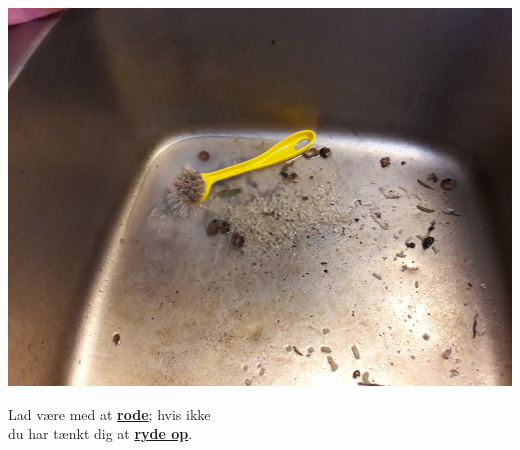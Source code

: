 \documentclass{article}
\begin{document}
\maketitle

\null
\vspace{-1.5cm}


\vspace{0.1in}

\begin{center}

\includegraphics[scale=0.4]{billeder/beskidt-vask.jpg}

\end{center}

\vspace{0.2in}

\begin{center}

{\fontsize{30}{40}\selectfont Lad være med at \textbf{\underline{rode}}; hvis
ikke\\ \vspace{0.1in} du har tænkt dig at \textbf{\underline{ryde op}}.}

\end{center}

\dansk

\underskriv
\end{document}
